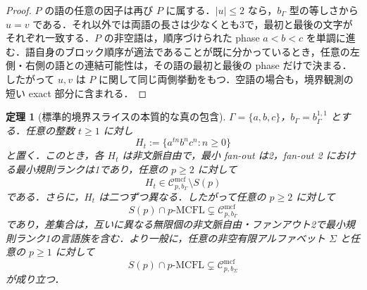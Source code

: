 \documentclass[11pt,a4paper]{ltjsarticle}
\numberwithin{equation}{section}
\theoremstyle{plain}
\newtheorem{theorem}{定理}[section]
\theoremstyle{definition}
\theoremstyle{remark}
\newcommand{\Cmcf}[2]{\mathcal{C}^{\mathrm{mcf}}_{#1,#2}}
\begin{document}
\begin{proof}
$P$ の語の任意の因子は再び $P$ に属する．$|u|\le2$ なら，$b_\Gamma$ 型の等しさから $u=v$ である．それ以外では両語の長さは少なくとも3で，最初と最後の文字がそれぞれ一致する．$P$ の非空語は，順序づけられた phase $a<b<c$ を単調に進む．語自身のブロック順序が適法であることが既に分かっているとき，任意の左側・右側の語との連結可能性は，その語の最初と最後の phase だけで決まる．したがって $u,v$ は $P$ に関して同じ両側挙動をもつ．空語の場合も，境界観測の短い exact 部分に含まれる．
\end{proof}

\begin{theorem}[標準的境界スライスの本質的な真の包含]
\label{thm:canonical-boundary-strictness}
$\Gamma=\{a,b,c\}$，$b_\Gamma=b_\Gamma^{1,1}$ とする．任意の整数 $t\ge1$ に対し
\[
  H_t:=\{a^{tn}b^nc^n:n\ge0\}
\]
と置く．このとき，各 $H_t$ は非文脈自由で，最小 fan-out は2，fan-out 2 における最小規則ランクは1であり，任意の $p\ge2$ に対して
\[
  H_t\in \Cmcf{p}{b_\Gamma}\setminus S(p)
\]
である．さらに，$H_t$ は二つずつ異なる．したがって任意の $p\ge2$ に対して
\[
  S(p)\cap p\text{-}\mathrm{MCFL}
  \subsetneq
  \Cmcf{p}{b_\Gamma}
\]
であり，差集合は，互いに異なる無限個の非文脈自由・ファンアウト2で最小規則ランク1の言語族を含む．より一般に，任意の非空有限アルファベット $\Sigma$ と任意の $p\ge1$ に対して
\[
  S(p)\cap p\text{-}\mathrm{MCFL}
  \subsetneq
  \Cmcf{p}{b_\Sigma}
\]
が成り立つ．
\end{theorem}
\end{document}
